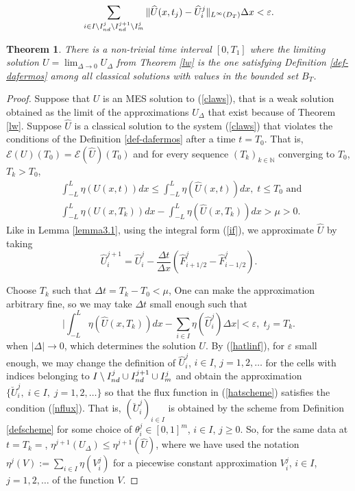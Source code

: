 \documentclass[10pt,a4paper]{amsart}
\newtheorem{theorem}{Theorem}
\begin{document}
\begin{equation} \label{hatlinf}
\sum_{i\in I\setminus I_{\rm nd}^{j}\setminus I_{\rm nd}^{j+1}
\setminus I_{\rm m}^{j}}
\| \widehat{U}(x,t_{j}) - \widehat{U}_{i}^{j}\|_{L^{\infty}(D_{T})}{\Delta x} 
< \varepsilon.
\end{equation}

\begin{theorem} \label{t-2}
There is a non-trivial time interval $[0,T_{1}]$ where the limiting solution 
$U=\lim_{\Delta \to 0}U_{\Delta}$ from Theorem \ref{lw} is the one 
satisfying Definition \ref{def-dafermos} among all classical solutions with values 
in the bounded set $B_{T}$.
\end{theorem}

\begin{proof}

Suppose that $U$ is an MES solution to (\ref{claws}), that is
a weak solution obtained as the limit of 
the approximations $U_{\Delta}$ that exist because of Theorem \ref{lw}. 
Suppose $\widehat{U}$ is a classical solution to the system (\ref{claws}) 
that violates the conditions of the Definition \ref{def-dafermos} 
after a time $t=T_{0}$. That is, $\mathcal{E}(U)(T_{0})
=\mathcal{E}(\widehat{U})(T_{0})$ and for every sequence
$(T_{k})_{k\in \mathbb{N}}$  converging to $T_{0}$, $T_{k}>T_{0}$,
\[
\begin{split}
& \int_{-L}^{L} \eta(U(x,t)) dx \leq \int_{-L}^{L} \eta(\widehat{U}(x,t))dx,
\; t\leq T_{0} \text{ and }\\ 
& \int_{-L}^{L} \eta(U(x,T_{k}))dx - \int_{-L}^{L} 
\eta(\widehat{U}(x,T_{k}))dx >\mu>0.
\end{split}
\]
Like in Lemma \ref{lemma3.1}, using the integral form (\ref{if}), we approximate $\hat{U}$ by taking
\begin{equation} \label{hatscheme}
\widehat{U}_{i}^{j+1} = \widehat{U}_{i}^{j} 
-\dfrac{\Delta t}{\Delta x}(\widehat{F}_{i+1/2}^{j}-\widehat{F}_{i-1/2}^{j}).
\end{equation}

Choose $T_{k}$ such that $\Delta t=T_{k}-T_{0}<\mu$, 
One can make the approximation arbitrary fine, so we may take $\Delta t$ small enough 
such that 
$$
\Big| \int_{-L}^{L}\eta(\hat{U}(x,T_{k}))dx-\sum_{i\in I}\eta(\hat{U}_{i}^{j})\Delta x
\Big| < \varepsilon, \; t_{j}=T_{k}.
$$
when $|\Delta|\to 0$, which determines the solution $U$.
By (\ref{hatlinf}), for 
$\varepsilon$ small enough, we may change the definition of $\widehat{U}_{i}^{j}$,
$i\in I$, $j=1,2, \ldots$ for the cells with indices belonging to 
$I \setminus I_{\rm nd}^{j}\cup I_{\rm nd}^{j+1}\cup I_{\rm m}^{j}$ and obtain the approximation
$\{\breve{U}_{i}^{j}, \; i\in I, \; j=1,2, \ldots\}$ so that
the flux function in (\ref{hatscheme}) satisfies the condition (\ref{nflux}).
That is, $(\breve{U}_{i}^{j})_{i\in I}$ is obtained by the scheme from 
Definition \ref{defscheme} for some choice of $\theta_{i}^{j}\in [0,1]^{m}$, 
$i\in I$, $j\geq 0$. So, for the same data at $t=T_{k}=$, 
$\eta^{j+1}(U_{\Delta})\leq \eta^{j+1}(\hat{U})$, where we have used the notation
$\eta^{j}(V):=\sum_{i\in I} \eta(V_{i}^{j})$ for a piecewise constant
approximation $V_{i}^{j}$, $i\in I$, $j=1,2, \ldots$ of the function $V$.


\end{proof}
\end{document}
